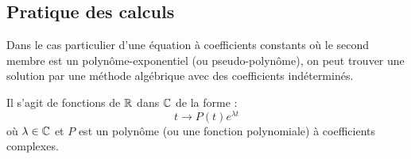 \subsection{Pratique des calculs}
Dans le cas particulier d'une équation à coefficients constants où le second membre est un polynôme-exponentiel (ou pseudo-polynôme), on peut trouver une solution par une méthode algébrique avec des coefficients indéterminés.
\begin{defi}
 Il s'agit de fonctions de $\mathbb{R}$ dans $\mathbb{C}$ de la forme :
\begin{displaymath}
 t \rightarrow P(t)e^{\lambda t}
\end{displaymath}
où $\lambda\in \mathbb{C}$ et $P$ est un polynôme (ou une fonction polynomiale) à coefficients complexes.
\end{defi}

